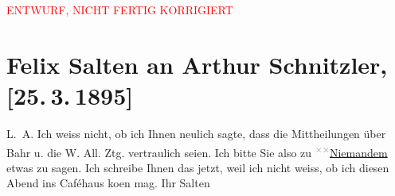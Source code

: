 
\begin{center}
            \textcolor{red}{ENTWURF, NICHT FERTIG KORRIGIERT}
                      \end{center}
            
         
         \renewcommand{\erwaehntePersonen}{Personen: Hermann Bahr}
         \renewcommand{\erwaehnteInstitutionen}{Institutionen: Wiener Allgemeine Zeitung}
         \renewcommand{\erwaehnteOrte}{Orte: Wien}
         \renewcommand{\erwaehnteWerke}{}
               \section[Felix Salten an Arthur Schnitzler, {[}25. 3. 1895{]}]{ Felix Salten an Arthur Schnitzler, {[}25. 3. 1895{]}}\nopagebreak{}\rehead{ }\begin{ledgroupsized}[t]{13cm}\normalsize\beginnumbering \toendnotes[C]{\smallbreak\pagebreak[2]} 
\pstart
           \noindent{}{\pb}L. A. Ich weiss nicht, ob ich Ihnen neulich sagte, dass die
               Mittheilungen über Bahr u. die W. All. Ztg. vertraulich seien. Ich bitte Sie also zu \substVorne{}\textsuperscript{\textcolor{gray}{×}\-\textcolor{gray}{×}}\substDazwischen{}\uline{Niemandem}\substHinten{} etwas zu sagen. \pend
           \pstart
           Ich schreibe Ihnen das jetzt, weil ich nicht weiss, ob ich diesen Abend ins Caféhaus
                  ko{\geminationm}en mag.\pend
           \pstart Ihr \spacefill\mbox{Salten}\pend{}
         
         \endnumbering{}\end{ledgroupsized}\begin{anhang}\end{anhang}\newcommand{\dateiname}{L03155}\newcommand{\titel}{Felix Salten an Arthur Schnitzler, [25. 3. 1895]}\newcommand{\editorInnen}{Martin Anton Müller und Laura Untner}
      